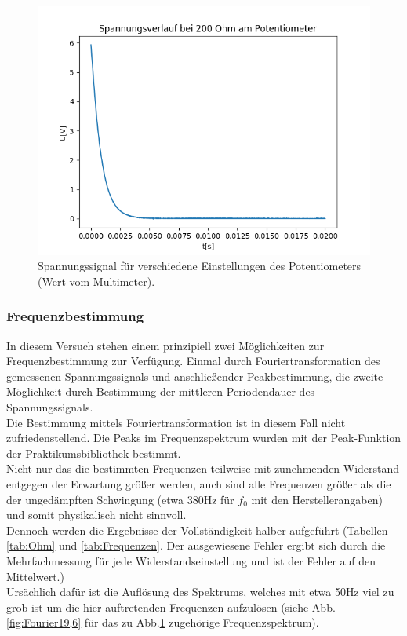 \documentclass[12pt,a4paper]{article}
\begin{document}
\begin{figure}
\begin{center}
\includegraphics[scale=0.5]{Bilder/Spannungsverlauf200}
\end{center}
\caption[Spannungsverlauf]{Spannungssignal für verschiedene Einstellungen des Potentiometers (Wert vom Multimeter).}
\label{fig:Spannung19,6}
\end{figure}



\subsubsection{Frequenzbestimmung}
In diesem Versuch stehen einem prinzipiell zwei Möglichkeiten zur Frequenzbestimmung zur Verfügung.
Einmal durch Fouriertransformation des gemessenen Spannungssignals und anschließender Peakbestimmung, die zweite Möglichkeit durch Bestimmung der mittleren Periodendauer des Spannungssignals.\\


Die Bestimmung mittels Fouriertransformation ist in diesem Fall nicht zufriedenstellend. Die Peaks im Frequenzspektrum wurden mit der Peak-Funktion der Praktikumsbibliothek bestimmt.\\
Nicht nur das die bestimmten Frequenzen teilweise mit zunehmenden Widerstand entgegen der Erwartung größer werden, auch sind alle Frequenzen größer als die der ungedämpften Schwingung (etwa 380Hz für $f_0$ mit den Herstellerangaben) und somit physikalisch nicht sinnvoll.\\
Dennoch werden die Ergebnisse der Vollständigkeit halber aufgeführt (Tabellen \ref{tab:Ohm} und 
\ref{tab:Frequenzen}. Der ausgewiesene Fehler ergibt sich durch die Mehrfachmessung für jede Widerstandseinstellung und ist der Fehler auf den Mittelwert.)\\
Ursächlich dafür ist die Auflösung des Spektrums, welches mit etwa 50Hz viel zu grob ist um die hier auftretenden Frequenzen aufzulösen (siehe Abb.\ref{fig:Fourier19,6} für das zu Abb.\ref{fig:Spannung19,6} zugehörige Frequenzspektrum).\\
\end{document}
